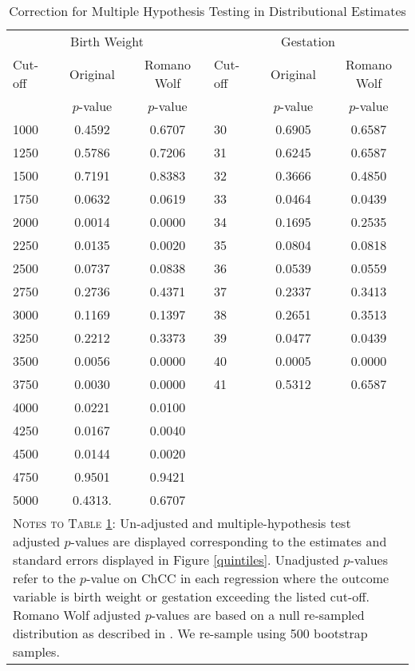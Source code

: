 \documentclass[12pt]{article}
\begin{document}
\begin{spacing}{1.4}
\clearpage
\begin{table}[htpb!]
  \caption{Correction for Multiple Hypothesis Testing in Distributional Estimates}
  \label{tab:RWdist}
\begin{tabular}{lcclcc} \toprule
  \multicolumn{3}{c}{Birth Weight}&\multicolumn{3}{c}{Gestation} \\ \cmidrule(r){1-3} \cmidrule(r){4-6}
  Cut-off & Original & Romano Wolf &   Cut-off & Original & Romano Wolf \\
  & $p$-value & $p$-value  &           & $p$-value& $p$-value \\ \midrule
  1000 &0.4592 & 0.6707 & 30 & 0.6905 & 0.6587 \\
  1250 &0.5786 & 0.7206 & 31 & 0.6245 & 0.6587 \\
  1500 &0.7191 & 0.8383 &           32 & 0.3666 & 0.4850 \\
  1750 &0.0632 & 0.0619 &           33 & 0.0464 & 0.0439 \\
  2000 &0.0014 & 0.0000 &           34 & 0.1695 & 0.2535 \\
  2250 &0.0135 & 0.0020 &           35 & 0.0804 & 0.0818 \\
  2500 &0.0737 & 0.0838 &           36 & 0.0539 & 0.0559 \\
  2750 &0.2736 & 0.4371 &           37 & 0.2337 & 0.3413 \\
  3000 &0.1169 & 0.1397 &           38 & 0.2651 & 0.3513 \\
  3250 &0.2212 & 0.3373 &           39 & 0.0477 & 0.0439 \\
  3500 &0.0056 & 0.0000 &           40 & 0.0005 & 0.0000 \\
  3750 &0.0030 & 0.0000 &           41 & 0.5312 & 0.6587 \\
  4000 &0.0221 & 0.0100 &    && \\
  4250 &0.0167 & 0.0040 &    && \\
  4500 &0.0144 & 0.0020 &    && \\
  4750 &0.9501 & 0.9421 &    && \\
  5000 &0.4313. & 0.6707&    && \\ \midrule
  \multicolumn{6}{p{12cm}}{{\footnotesize \textsc{Notes to Table \ref{tab:RWdist}}: Un-adjusted and
      multiple-hypothesis test adjusted $p$-values are displayed corresponding to the estimates and
      standard errors displayed in Figure \ref{quintiles}.  Unadjusted $p$-values refer to the
      $p$-value on ChCC in each regression where the outcome variable is birth weight or gestation
      exceeding the listed cut-off.  Romano Wolf adjusted $p$-values are based on a null
      re-sampled distribution as described in \citet{RomanoWolf2005}.  We re-sample using 500
      bootstrap samples.}} \\ \bottomrule
\end{tabular}
\end{table}



\end{spacing}
\end{document}
